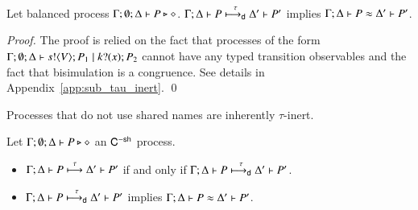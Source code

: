 \begin{proposition}\rm
	\label{lem:tau_inert}
	Let balanced \HOp process $\Gamma; \emptyset; \Delta \vdash P \triangleright \diamond$.
	$\Gamma; \Delta \vdash P \stackrel{\tau}{\longmapsto_{\mathsf{d}}} \Delta' \vdash P'$ implies
	$\Gamma; \Delta \vdash P \approx \Delta' \vdash P'$.
\end{proposition}

\begin{proof}
	The proof is relied on the fact that processes of the
	form $\Gamma; \emptyset; \Delta \vdash s ! \langle V \rangle ; P_1 \;|\; k ? (x) ; P_2$
	cannot have any typed transition observables and the fact
	that bisimulation is a congruence.
	See details in Appendix~\ref{app:sub_tau_inert}.
	\qed
\end{proof}

Processes that do not use shared names are inherently $\tau$-inert.

\begin{corollary}\rm
	\label{cor:tau_inert}
	Let $\Gamma; \emptyset; \Delta \vdash P \triangleright \diamond$ an $\mathsf{C}^{\mathsf{-sh}}$ process.
%
	\begin{itemize}
		\item	$\Gamma; \Delta \vdash P \stackrel{\tau}{\longmapsto} \Delta' \vdash P'$ if and only if $\Gamma; \Delta \vdash P \stackrel{\tau}{\longmapsto_{\mathsf{d}}} \Delta' \vdash P'$.
		\item	$\Gamma; \Delta \vdash P \stackrel{\tau}{\longmapsto_{\mathsf{d}}} \Delta' \vdash P'$ implies $\Gamma; \Delta \vdash P \approx \Delta' \vdash P'$.
	\end{itemize}
\end{corollary}

